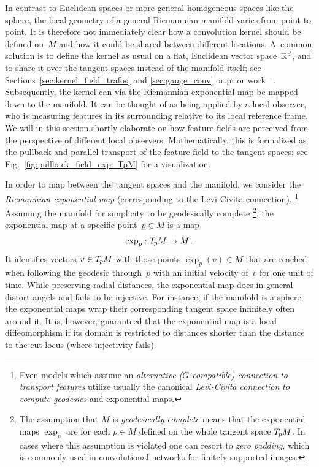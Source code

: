 In contrast to Euclidean spaces or more general homogeneous spaces like the sphere, the local geometry of a general Riemannian manifold varies from point to point.
It is therefore not immediately clear how a convolution kernel should be defined on~$M$ and how it could be shared between different locations.
A~common solution is to define the kernel as usual on a flat, Euclidean vector space~$\mathbb{R}^d$, and to share it over the tangent spaces instead of the manifold itself;
see Sections~\ref{sec:kernel_field_trafos} and \ref{sec:gauge_conv} or prior work~%
\cite{masci2015geodesic,poulenard2018multi,sun2018zernet,coors2018spherenet,gaugeIco2019,Wiersma2020,deHaan2020meshCNNs,Yang2020parallelFrameCNN}.
Subsequently, the kernel can via the Riemannian exponential map be mapped down to the manifold.
It can be thought of as being applied by a local observer, who is measuring features in its surrounding relative to its local reference frame.
We will in this section shortly elaborate on how feature fields are perceived from the perspective of different local observers.
Mathematically, this is formalized as the pullback and parallel transport of the feature field to the tangent spaces; see Fig.~\ref{fig:pullback_field_exp_TpM} for a visualization.


In order to map between the tangent spaces and the manifold, we consider the \emph{Riemannian exponential map} (corresponding to the Levi-Civita connection).%
\footnote{
    Even models which assume an \emph{alternative ($G$-compatible) connection to transport features} utilize usually the canonical \emph{Levi-Civita connection to compute geodesics} and exponential maps.
}
Assuming the manifold for simplicity to be geodesically complete%
\footnote{
    The assumption that $M$ is \emph{geodesically complete} means that the exponential maps $\exp_p$ are for each $p\in M$ defined on the whole tangent space $T_{\mkern-1.5mu p}\mkern-.5muM$.
    In cases where this assumption is violated one can resort to \emph{zero padding}, which is commonly used in convolutional networks for finitely supported images.
},
the exponential map at a specific point~$p\in M$ is a map
\begin{align}
    \exp_p: T_{\mkern-1.5mu p}\mkern-.5muM \to M \,.
\end{align}
It identifies vectors $v\in T_{\mkern-1.5mu p}\mkern-.5muM$ with those points $\exp_p(v) \in M$ that are reached when following the geodesic through~$p$ with an initial velocity of~$v$ for one unit of time.
While preserving radial distances, the exponential map does in general distort angels and fails to be injective.
For instance, if the manifold is a sphere, the exponential maps wrap their corresponding tangent space infinitely often around it.
It is, however, guaranteed that the exponential map is a local diffeomorphism if its domain is restricted to distances shorter than the distance to the cut locus (where injectivity fails).


